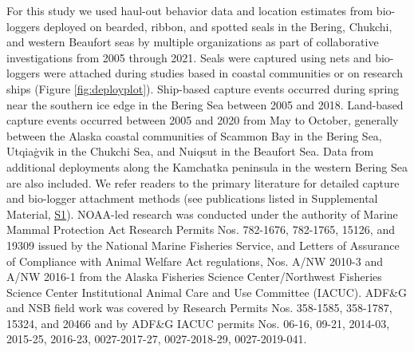 \documentclass[fleqn,10pt,lineno]{wlpeerj} %
\begin{document}
For this study we used haul-out behavior data and location estimates from
bio-loggers deployed on bearded, ribbon, and spotted seals in the Bering,
Chukchi, and western Beaufort seas by multiple organizations as part of
collaborative investigations from 2005 through 2021. Seals were captured using
nets and bio-loggers were attached during studies based in coastal communities
or on research ships (Figure \ref{fig:deployplot}). Ship-based capture events
occurred during spring near the southern ice edge in the Bering Sea between 2005
and 2018. Land-based capture events occurred between 2005 and 2020 from May to
October, generally between the Alaska coastal communities of Scammon Bay in the
Bering Sea, Utqiaġvik in the Chukchi Sea, and Nuiqsut in the Beaufort Sea. Data
from additional deployments along the Kamchatka peninsula in the western Bering
Sea are also included. We refer readers to the primary literature for detailed
capture and bio-logger attachment methods (see publications listed in
Supplemental Material, \hyperref[s1]{S1}). NOAA-led research was conducted under the
authority of Marine Mammal Protection Act Research Permits Nos. 782-1676,
782-1765, 15126, and 19309 issued by the National Marine Fisheries Service, and
Letters of Assurance of Compliance with Animal Welfare Act regulations, Nos.
A/NW 2010-3 and A/NW 2016-1 from the Alaska Fisheries Science Center/Northwest
Fisheries Science Center Institutional Animal Care and Use Committee (IACUC).
ADF\&G and NSB field work was covered by Research Permits Nos. 358-1585,
358-1787, 15324, and 20466 and by ADF\&G IACUC permits Nos. 06-16, 09-21,
2014-03, 2015-25, 2016-23, 0027-2017-27, 0027-2018-29, 0027-2019-041.
\end{document}
